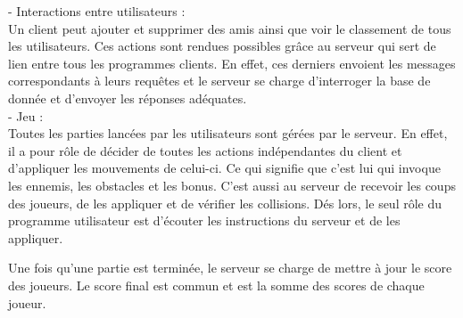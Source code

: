 \documentclass[a4paper,12pt]{article}
\begin{document}
- Interactions entre utilisateurs : \\
Un client peut ajouter et supprimer des amis ainsi que voir le classement de tous les utilisateurs. 
Ces actions sont rendues possibles grâce au serveur qui sert de lien entre tous les programmes clients. 
En effet, ces derniers envoient les messages correspondants à leurs requêtes et le serveur se charge d'interroger la base de donnée et d'envoyer les réponses adéquates. \\

- Jeu : \\
Toutes les parties lancées par les utilisateurs sont gérées par le serveur. En effet, il a pour rôle de décider de toutes les actions indépendantes du client et d'appliquer les mouvements de celui-ci.
Ce qui signifie que c'est lui qui invoque les ennemis, les obstacles et les bonus. C'est aussi au serveur de recevoir les coups des joueurs, de les appliquer et de vérifier les collisions.
Dés lors, le seul rôle du programme utilisateur est d'écouter les instructions du serveur et de les appliquer. 

Une fois qu'une partie est terminée, le serveur se charge de mettre à jour le score des joueurs. Le score final est commun et est la somme des scores de chaque joueur.
\end{document}
